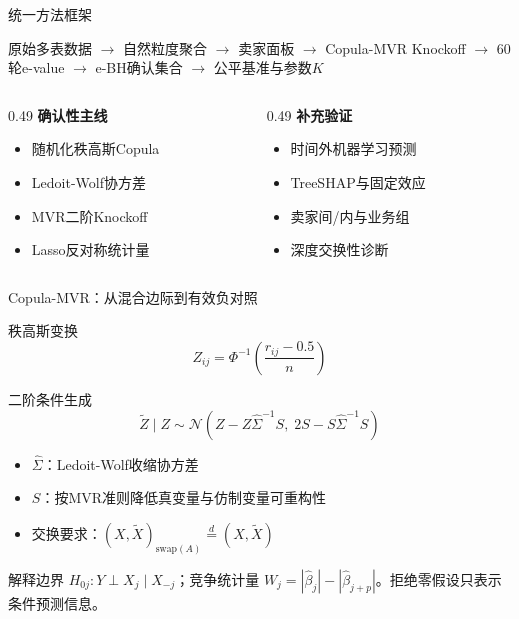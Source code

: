 \documentclass[aspectratio=169]{beamer}
\begin{document}
\begin{frame}{统一方法框架}
  \begin{center}
    \large
    原始多表数据
    $\rightarrow$ 自然粒度聚合
    $\rightarrow$ 卖家面板
    $\rightarrow$ Copula-MVR Knockoff
    $\rightarrow$ 60轮e-value
    $\rightarrow$ e-BH确认集合
    $\rightarrow$ 公平基准与参数$K$
  \end{center}
  \vspace{0.5cm}
  \begin{columns}[T]
    \begin{column}{0.49\textwidth}
      \textbf{确认性主线}
      \begin{itemize}
        \item 随机化秩高斯Copula
        \item Ledoit-Wolf协方差
        \item MVR二阶Knockoff
        \item Lasso反对称统计量
      \end{itemize}
    \end{column}
    \begin{column}{0.49\textwidth}
      \textbf{补充验证}
      \begin{itemize}
        \item 时间外机器学习预测
        \item TreeSHAP与固定效应
        \item 卖家间/内与业务组
        \item 深度交换性诊断
      \end{itemize}
    \end{column}
  \end{columns}
\end{frame}

\begin{frame}[shrink=8]{Copula-MVR：从混合边际到有效负对照}
  \begin{block}{秩高斯变换}
    \begin{equation*}
      Z_{ij}=\Phi^{-1}\left(\frac{r_{ij}-0.5}{n}\right)
    \end{equation*}
  \end{block}
  \begin{block}{二阶条件生成}
    \begin{equation*}
      \widetilde Z\mid Z\sim
      \mathcal N\left(
        Z-Z\widehat\Sigma^{-1}S,\;
        2S-S\widehat\Sigma^{-1}S
      \right)
    \end{equation*}
  \end{block}
  \begin{itemize}
    \item $\widehat\Sigma$：Ledoit-Wolf收缩协方差
    \item $S$：按MVR准则降低真变量与仿制变量可重构性
    \item 交换要求：$(X,\widetilde X)_{\mathrm{swap}(A)}\overset d=(X,\widetilde X)$
  \end{itemize}
  \begin{alertblock}{解释边界}
    $H_{0j}:Y\perp X_j\mid X_{-j}$；竞争统计量
    $W_j=|\widehat\beta_j|-|\widehat\beta_{j+p}|$。拒绝零假设只表示条件预测信息。
  \end{alertblock}
\end{frame}
\end{document}
